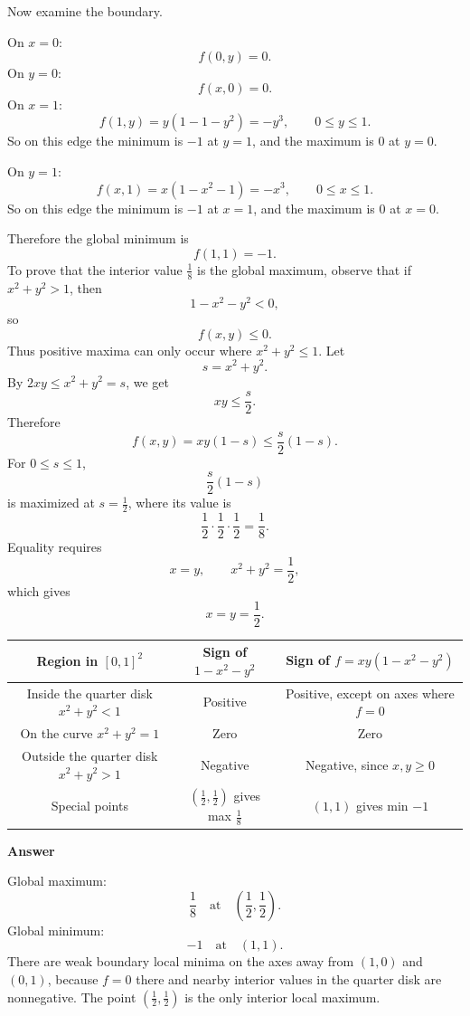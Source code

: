 \documentclass[11pt]{article}
\newenvironment{answerbox}[1]{\par\medskip\noindent\textcolor{linegreen}{\textbf{#1}}\par\smallskip}{\par\medskip}
\begin{document}
Now examine the boundary.

On $x=0$:
\[
f(0,y)=0.
\]
On $y=0$:
\[
f(x,0)=0.
\]
On $x=1$:
\[
f(1,y)=y(1-1-y^2)=-y^3,
\qquad 0\le y\le1.
\]
So on this edge the minimum is $-1$ at $y=1$, and the maximum is $0$ at $y=0$.

On $y=1$:
\[
f(x,1)=x(1-x^2-1)=-x^3,
\qquad 0\le x\le1.
\]
So on this edge the minimum is $-1$ at $x=1$, and the maximum is $0$ at $x=0$.

Therefore the global minimum is
\[
f(1,1)=-1.
\]
To prove that the interior value $\frac18$ is the global maximum, observe that if $x^2+y^2>1$, then
\[
1-x^2-y^2<0,
\]
so
\[
f(x,y)\le0.
\]
Thus positive maxima can only occur where $x^2+y^2\le1$.  Let
\[
s=x^2+y^2.
\]
By $2xy\le x^2+y^2=s$, we get
\[
xy\le\frac{s}{2}.
\]
Therefore
\[
f(x,y)=xy(1-s)\le\frac{s}{2}(1-s).
\]
For $0\le s\le1$,
\[
\frac{s}{2}(1-s)
\]
is maximized at $s=\frac12$, where its value is
\[
\frac12\cdot\frac12\cdot\frac12=\frac18.
\]
Equality requires
\[
x=y,
\qquad x^2+y^2=\frac12,
\]
which gives
\[
x=y=\frac12.
\]



\begin{center}
\renewcommand{\arraystretch}{1.4}
\begin{tabular}{|c|c|c|}
\hline
\textbf{Region in $[0,1]^2$} & \textbf{Sign of $1-x^2-y^2$} & \textbf{Sign of $f=xy(1-x^2-y^2)$}\\
\hline
Inside the quarter disk $x^2+y^2<1$ & Positive & Positive, except on axes where $f=0$\\
\hline
On the curve $x^2+y^2=1$ & Zero & Zero\\
\hline
Outside the quarter disk $x^2+y^2>1$ & Negative & Negative, since $x,y\ge0$\\
\hline
Special points & $\left(\frac12,\frac12\right)$ gives max $\frac18$ & $(1,1)$ gives min $-1$\\
\hline
\end{tabular}
\end{center}



\begin{answerbox}{Answer}
Global maximum:
\[
\frac18\quad\text{at}\quad \left(\frac12,\frac12\right).
\]
Global minimum:
\[
-1\quad\text{at}\quad (1,1).
\]
There are weak boundary local minima on the axes away from $(1,0)$ and $(0,1)$, because $f=0$ there and nearby interior values in the quarter disk are nonnegative. The point $\left(\frac12,\frac12\right)$ is the only interior local maximum.
\end{answerbox}
\end{document}
